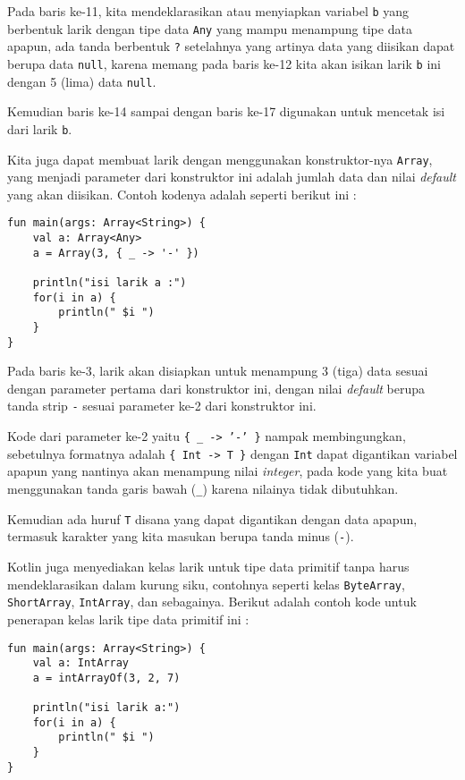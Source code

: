 Pada baris ke-11, kita mendeklarasikan atau menyiapkan variabel \texttt{b} yang berbentuk larik dengan tipe data \texttt{Any} yang mampu menampung tipe data apapun, ada tanda berbentuk \texttt{?} setelahnya yang artinya data yang diisikan dapat berupa data \texttt{null}, karena memang pada baris ke-12 kita akan isikan larik \texttt{b} ini dengan 5 (lima) data \texttt{null}.

Kemudian baris ke-14 sampai dengan baris ke-17 digunakan untuk mencetak isi dari larik \texttt{b}.

Kita juga dapat membuat larik dengan menggunakan konstruktor-nya \texttt{Array}, yang menjadi parameter dari konstruktor ini adalah jumlah data dan nilai \textit{default} yang akan diisikan. Contoh kodenya adalah seperti berikut ini : 

\begin{lstlisting}
fun main(args: Array<String>) {
	val a: Array<Any>
	a = Array(3, { _ -> '-' })
	
	println("isi larik a :")
	for(i in a) {
		println(" $i ")
	}
}
\end{lstlisting}

Pada baris ke-3, larik akan disiapkan untuk menampung 3 (tiga) data sesuai dengan parameter pertama dari konstruktor ini, dengan nilai \textit{default} berupa tanda strip \texttt{-} sesuai parameter ke-2 dari konstruktor ini.

Kode dari parameter ke-2 yaitu \texttt{\{ \_ -> '-' \}} nampak membingungkan, 
sebetulnya formatnya adalah \texttt{\{ Int -> T \}} dengan \texttt{Int} dapat digantikan variabel apapun yang nantinya akan menampung nilai \textit{integer}, pada kode yang kita buat menggunakan tanda garis bawah (\texttt{\_}) karena nilainya tidak dibutuhkan. 

Kemudian ada huruf \texttt{T} disana yang dapat digantikan dengan data apapun, termasuk karakter yang kita masukan berupa tanda minus (\texttt{-}).

Kotlin juga menyediakan kelas larik untuk tipe data primitif tanpa harus mendeklarasikan dalam kurung siku, contohnya seperti kelas \texttt{ByteArray}, \texttt{ShortArray}, \texttt{IntArray}, dan sebagainya. Berikut adalah contoh kode untuk penerapan kelas larik tipe data primitif ini :

\begin{lstlisting}
fun main(args: Array<String>) {
	val a: IntArray
	a = intArrayOf(3, 2, 7)
	
	println("isi larik a:")
	for(i in a) {
		println(" $i ")
	}
}
\end{lstlisting}

